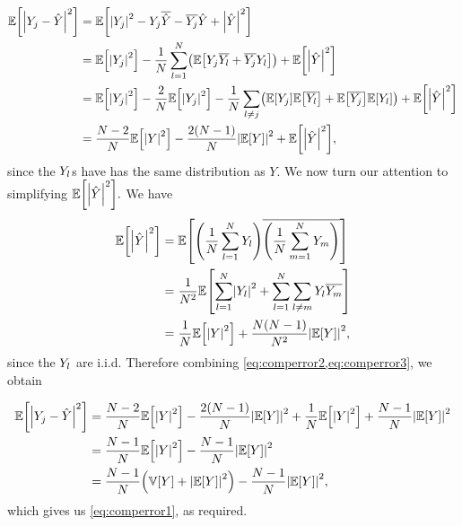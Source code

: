 \begin{align}
\EXP{\abs{\Yj-\Yhat}^2} &= \EXP{\abs{\Yj}^2 - \Yj \Yhatbar - \Yjbar \Yhat + \abs{\Yhat}^2}\nonumber\\
&= \EXP{\abs{\Yj}^2} - \frac1N\sum_{l=1}^N \mleft(\EXP{\Yj\Ylbar + \Yjbar \Yl}\mright) + \EXP{\abs{\Yhat}^2}\nonumber\\
&= \EXP{\abs{\Yj}^2} - \frac2N \EXP{\abs{\Yj}^2} - \frac1N \sum_{l \neq j} \mleft(\EXP{\Yj}\EXP{\Ylbar} + \EXP{\Yjbar}\EXP{\Yl}\mright) + \EXP{\abs{\Yhat}^2}\nonumber\\
&= \frac{N-2}N \EXP{\abs{Y}^2} - \frac{2(N-1)}N \abs{\EXP{Y}}^2 + \EXP{\abs{\Yhat}^2},\label{eq:comperror2}
  \end{align}
since the $Y_{l}$s have has the same distribution as $Y$. We now turn our attention to simplifying $\EXP{\abs{\Yhat}^2}.$ We have
\begin{align}
\EXP{\abs{\Yhat}^2} &= \EXP{\mleft(\frac1N \sum_{l=1}^N \Yl\mright)\overline{\mleft(\frac1N \sum_{m=1}^N \Ym\mright)}}\nonumber\\
&= \frac1{N^2}\EXP{ \sum_{l=1}^N \abs{\Yl}^2 + \sum_{l=1}^N\sum_{l \neq m} \Yl\Ymbar}\nonumber\\
&= \frac1N \EXP{\abs{Y}^2} + \frac{N(N-1)}{N^2}\abs{\EXP{Y}}^2,\label{eq:comperror3}
\end{align}
since the  $Y_{l}$ are i.i.d. Therefore combining \cref{eq:comperror2,eq:comperror3}, we obtain

\begin{align*}
\EXP{\abs{\Yj-\Yhat}^2} &= \frac{N-2}N \EXP{\abs{Y}^2} - \frac{2(N-1)}N \abs{\EXP{Y}}^2 + \frac1N \EXP{\abs{Y}^2} + \frac{N-1}{N}\abs{\EXP{Y}}^2\\
&= \frac{N-1}N \EXP{\abs{Y}^2} - \frac{N-1}N \abs{\EXP{Y}}^2\\
&= \frac{N-1}N \mleft(\VAR{Y}+\abs{\EXP{Y}}^2\mright) - \frac{N-1}N \abs{\EXP{Y}}^2,
\end{align*}
which gives us \cref{eq:comperror1}, as required.
\epf


